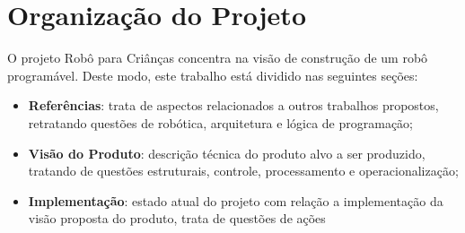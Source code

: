 \section{Organização do Projeto}
O projeto Robô para Criânças concentra na visão de construção de um robô programável. Deste modo, este trabalho está dividido nas seguintes seções:
\begin{itemize}
	\item \textbf{Referências}: trata de aspectos relacionados a outros trabalhos propostos, retratando questões de robótica, arquitetura e lógica de programação;
	\item \textbf{Visão do Produto}: descrição técnica do produto alvo a ser produzido, tratando de questões estruturais, controle, processamento e operacionalização;
	\item \textbf{Implementação}: estado atual do projeto com relação a implementação da visão proposta do produto, trata de questões de ações
\end{itemize}

